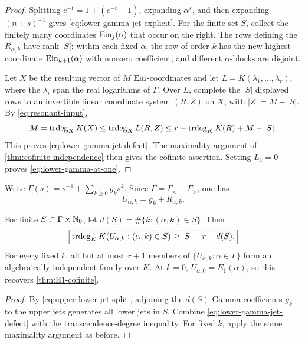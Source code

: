 \begin{proof}
Splitting \(e^{-t}=1+(e^{-t}-1)\), expanding \(\alpha^s\), and then
expanding \((n+s)^{-1}\) gives \eqref{eq:lower-gamma-jet-explicit}.
For the finite set \(S\), collect the finitely many coordinates
\(\operatorname{Ein}_j(\alpha)\) that occur on the right.  The rows defining the
\(R_{\alpha,k}\) have rank \(|S|\): within each fixed \(\alpha\), the row
of order \(k\) has the new highest coordinate \(\operatorname{Ein}_{k+1}(\alpha)\) with
nonzero coefficient, and different \(\alpha\)-blocks are disjoint.

Let \(X\) be the resulting vector of \(M\) \(\operatorname{Ein}\)-coordinates and let
\(L=K(\lambda_1,\ldots,\lambda_r)\), where the \(\lambda_i\) span the real
logarithms of \(\Gamma\).  Over \(L\), complete the \(|S|\) displayed rows
to an invertible linear coordinate system \((R,Z)\) on \(X\), with
\(|Z|=M-|S|\).  By \eqref{eq:resonant-input},
\[
 M=\operatorname{trdeg}_KK(X)
 \le\operatorname{trdeg}_KL(R,Z)
 \le r+\operatorname{trdeg}_KK(R)+M-|S|.
\]
This proves \eqref{eq:lower-gamma-jet-defect}.  The maximality argument of
\cref{thm:cofinite-independence} then gives the cofinite assertion.
Setting \(L_1=0\) proves \eqref{eq:lower-gamma-at-one}.
\end{proof}

Write \(\Gamma(s)=s^{-1}+\sum_{k\ge0}g_ks^k\).  Since
\(\Gamma=\Gamma_<+\Gamma_>\), one has
\begin{equation}\label{eq:upper-lower-jet-split}
 U_{\alpha,k}=g_k+R_{\alpha,k}.
\end{equation}

\begin{corollary}
\label{cor:upper-gamma-jets}
For finite \(S\subset\Gamma\times\mathbb N_0\), let
\(d(S)=\#\{k:(\alpha,k)\in S\}\).  Then
\begin{equation}\label{eq:upper-gamma-jet-defect}
 \boxed{\displaystyle
 \operatorname{trdeg}_KK(U_{\alpha,k}:(\alpha,k)\in S)
 \ge |S|-r-d(S).}
\end{equation}
For every fixed \(k\), all but at most \(r+1\) members of
\(\{U_{\alpha,k}:\alpha\in\Gamma\}\) form an algebraically independent
family over \(K\).  At \(k=0\), \(U_{\alpha,0}=E_1(\alpha)\), so this
recovers \cref{thm:E1-cofinite}.
\end{corollary}

\begin{proof}
By \eqref{eq:upper-lower-jet-split}, adjoining the \(d(S)\) Gamma
coefficients \(g_k\) to the upper jets generates all lower jets in \(S\).
Combine \eqref{eq:lower-gamma-jet-defect} with the transcendence-degree
inequality.  For fixed \(k\), apply the same maximality argument as before.
\end{proof}

